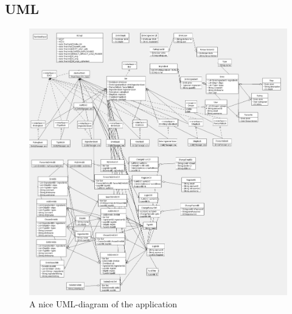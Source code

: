 \documentclass[a4paper]{article}
\begin{document}
\subsection{UML}

\begin{figure}[H]
  \begin{center}
    \includegraphics[width=1.3 \textwidth]{UML_final.png}
  \end{center}
  \caption{A nice UML-diagram of the application }
  \label{fig:awesomepicture}
\end{figure}
\end{document}
